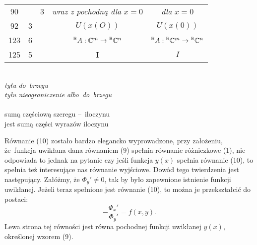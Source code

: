 \documentclass[a4paper,11pt]{article}
\begin{document}
\begin{center}
\begin{tabular}{|c|c|c|c|c|}
    90  & &  3 & \textit{wraz z pochodną dla} $x = 0$
           & \textit{dla} $x = 0$ \\
    92  &  3 & & $U( x( O ) )$ & $U( x( 0 ) )$ \\[0.3em]
    123 &  6 & & $^{ \mathbb{R} }A : \mathbb{C}^{ m } \to { }^{ \mathbb{R} } \mathbb{C}^{ n }$
           & ${ }^{ \mathbb{R} }A : { }^{ \mathbb{R} } \mathbb{C}^{ m }
             \to { }^{ \mathbb{R} } \mathbb{C}^{ n }$ \\
    125 &  5 & & $\mathbf{I}$ & $I$ \\
    \hline
  \end{tabular}

\end{center}


\noindent
{} \\
\Jest  \textit{tyłu do~brzegu} \\
\Powin \textit{tyłu nieograniczenie albo~do~brzegu} \\
 \\
\Jest  sumą częściową szeregu --~iloczynu \\
\Powin jest sumą części wyrazów iloczynu \\


\vspace{\spaceTwo}














\start {} Równanie (10) zostało bardzo elegancko wyprowadzone,
przy założeniu, że~funkcja uwikłana dana równaniem (9) spełnia
równanie różniczkowe (1), nie odpowiada to jednak na pytanie czy jeśli
funkcja $y( x )$ spełnia równanie (10), to spełnia też interesujące
nas równanie wyjściowe. Dowód tego twierdzenia jest następujący.
Załóżmy, że $\Phi_{ y }' \neq 0$, tak by było zapewnione istnienie
funkcji uwikłanej. Jeżeli teraz spełnione jest równanie (10), to można
je przekształcić do postaci:
\begin{equation}
  \label{MatwiejewMCRRZ-01}
  -\frac{ \Phi_{ x }' }{ \Phi_{ y }' } = f( x, y ).
\end{equation}
Lewa strona tej równości jest równa pochodnej funkcji uwikłanej
$y( x )$, określonej wzorem (9).
\end{document}
